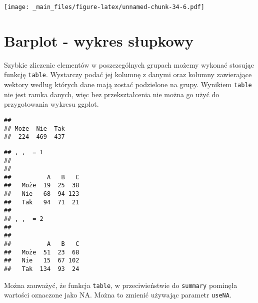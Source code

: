 \documentclass[
]{book}
\newenvironment{Shaded}{\begin{snugshade}}{\end{snugshade}}
\newcommand{\AttributeTok}[1]{\textcolor[rgb]{0.77,0.63,0.00}{#1}}
\newcommand{\FunctionTok}[1]{\textcolor[rgb]{0.00,0.00,0.00}{#1}}
\newcommand{\NormalTok}[1]{#1}
\newcommand{\SpecialCharTok}[1]{\textcolor[rgb]{0.00,0.00,0.00}{#1}}
\newcommand{\StringTok}[1]{\textcolor[rgb]{0.31,0.60,0.02}{#1}}
\begin{document}
\texttt{[image: \_main\_files/figure-latex/unnamed-chunk-34-6.pdf]}

\hypertarget{barplot---wykres-sux142upkowy}{%
\section{Barplot - wykres słupkowy}\label{barplot---wykres-sux142upkowy}}

Szybkie zliczenie elementów w poszczególnych grupach możemy wykonać stosując funkcję \texttt{table}. Wystarczy podać jej kolumnę z danymi oraz kolumny zawierające wektory według których dane mają zostać podzielone na grupy. Wynikiem \texttt{table} nie jest ramka danych, więc bez przekształcenia nie można go użyć do przygotowania wykresu ggplot.

\begin{Shaded}
\end{Shaded}

\begin{verbatim}
## 
## Może  Nie  Tak 
##  224  469  437
\end{verbatim}

\begin{Shaded}
\end{Shaded}

\begin{verbatim}
## , ,  = 1
## 
##       
##          A   B   C
##   Może  19  25  38
##   Nie   68  94 123
##   Tak   94  71  21
## 
## , ,  = 2
## 
##       
##          A   B   C
##   Może  51  23  68
##   Nie   15  67 102
##   Tak  134  93  24
\end{verbatim}

Można zauważyć, że funkcja \texttt{table}, w przeciwieństwie do \texttt{summary} pominęła wartości oznaczone jako NA. Można to zmienić używając parametr \texttt{useNA}.

\begin{Shaded}
\end{Shaded}
\end{document}
